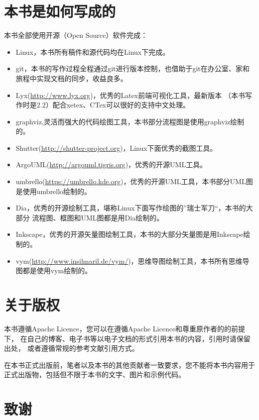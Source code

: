 \section*{本书是如何写成的}
本书全部使用开源（Open Source）软件完成：
\begin{itemize}
    \item Linux，本书所有稿件和源代码均在Linux下完成。
    \item git，本书的写作过程全程通过git进行版本控制，也借助于git在办公室、家和旅程中实现文档的同步，收益良多。
    \item Lyx(\url{http://www.lyx.org})，优秀的Latex前端可视化工具，最新版本
        （本书写作时是2.2）配合xetex、CTex可以很好的支持中文处理。
    \item graphviz,灵活而强大的代码绘图工具，本书部分流程图是使用graphviz绘制的。
    \item Shutter(\url{http://shutter-project.org})，Linux下面优秀的截图工具。
    \item ArgoUML(\url{http://argouml.tigris.org})，优秀的开源UML工具。
    \item umbrello(\url{https://umbrello.kde.org})，优秀的开源UML工具，本书部分UML图是使用umbrello绘制的。
    \item Dia，优秀的开源绘制工具，堪称Linux下面写作绘图的”瑞士军刀“，本书的大部分
        流程图、框图和UML图都是用Dia绘制的。
    \item Inkscape，优秀的开源矢量图绘制工具，本书的大部分矢量图是用Inkscape绘制的。
    \item vym(\url{http://www.insilmaril.de/vym/})，思维导图绘制工具，本书所有思维导图都是使用vym绘制的。
\end{itemize}

\section*{关于版权}
本书遵循Apache Licence，您可以在遵循Apache Licence和尊重原作者的的前提下，
在自己的博客、电子书等以电子文档的形式引用本书的内容，引用时请保留出处，
或者遵循常规的参考文献引用方式。

在本书正式出版前，笔者以及本书的其他贡献者一致要求，您不能将本书内容用于
正式出版物，包括但不限于本书的文字、图片和示例代码。

\section*{致谢}

